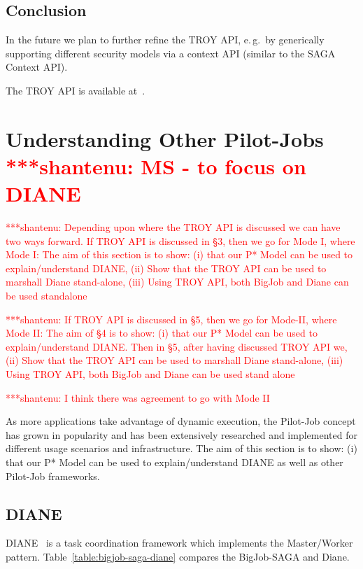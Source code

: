 \documentclass[conference,final]{IEEEtran}
\newcommand{\jhanote}[1]{ {\textcolor{red} { ***shantenu: #1 }}}
\newcommand{\jhanote}[1]{}
\begin{document}
\subsection{Conclusion}

In the future we plan to further refine the TROY API, e.\,g.\ by generically supporting different security models via a context API (similar to the SAGA Context API).

The TROY API is available at~\cite{troy_api}.


\section{Understanding Other Pilot-Jobs \jhanote{MS - to focus on
    DIANE}}


\jhanote{Depending upon where the TROY API is discussed we can have
  two ways forward. If TROY API is discussed in \S 3, then we go for
  Mode I, where Mode I: The aim of this section is to show: (i) that
  our P* Model can be used to explain/understand DIANE, (ii) Show that
  the TROY API can be used to marshall Diane stand-alone, (iii) Using
  TROY API, both BigJob and Diane can be used standalone}

\jhanote{If TROY API is discussed in \S 5, then we go for Mode-II,
  where Mode II: The aim of \S 4 is to show: (i) that our P* Model can
  be used to explain/understand DIANE.  Then in \S 5, after having
  discussed TROY API we, (ii) Show that the TROY API can be used to
  marshall Diane stand-alone, (iii) Using TROY API, both BigJob and
  Diane can be used stand alone}

\jhanote{I think there was agreement to go with Mode II}

As more applications take advantage of dynamic execution, the Pilot-Job concept
has grown in popularity and has been extensively researched and implemented for
different usage scenarios and infrastructure. The aim of this section is to
show: (i) that our P* Model can be used to explain/understand DIANE as well as
other Pilot-Job frameworks.

\subsection{DIANE}

DIANE~\cite{Moscicki:908910} is a task coordination framework which
implements the Master/Worker pattern. Table~\ref{table:bigjob-saga-diane} 
compares the BigJob-SAGA and Diane. 
\end{document}
